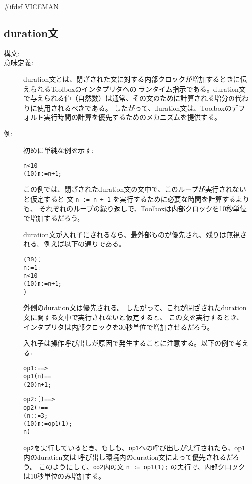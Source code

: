\documentclass[\pformat,12pt]{jarticle}
\begin{document}
#ifdef VICEMAN
\subsection{duration文}
\begin{description}
\item[構文:]

\item[意味定義:]
duration文とは、閉ざされた文に対する内部クロックが増加するときに伝えられるToolboxのインタプリタへの
ランタイム指示である。duration文で与えられる値（自然数）は通常、その文のために計算される増分の代わりに使用されるべきである。
したがって、duration文は、Toolboxのデフォルト実行時間の計算を優先するためのメカニズムを提供する。

\item[例:]初めに単純な例を示す:
\begin{alltt}
       n < 10 
         (10) n := n + 1; 
\end{alltt}
この例では、閉ざされたduration文の文中で、このループが実行されないと仮定すると
文 \texttt{n := n + 1} を実行するために必要な時間を計算するよりも、
それぞれのループの繰り返しで、Toolboxは内部クロックを10秒単位で増加するだろう。

duration文が入れ子にされるなら、最外部ものが優先され、残りは無視される。例えば以下の通りである。

\begin{alltt}
      (30)(
        n := 1;
         n < 10 
           (10) n := n + 1; 
        )
\end{alltt}
外側のduration文は優先される。
したがって、これが閉ざされたduration文に関する文中で実行されないと仮定すると、
この文を実行するとき、インタプリタは内部クロックを30秒単位で増加させるだろう。

入れ子は操作呼び出しが原因で発生することに注意する。以下の例で考える:
\begin{alltt}
      op1 :  ==> 
      op1(m) ==
        (20)  m + 1;

      op2 : () ==> 
      op2() ==
      ( n :  := 3;
       (10)  n := op1(1);
        n) 
\end{alltt}
\texttt{op2}を実行しているとき、もしも、\texttt{op1}への呼び出しが実行されたら、op1内のduration文は
呼び出し環境内のduration文によって優先されるだろう。
このようにして、\texttt{op2}内の文 \texttt{n := op1(1);} の実行で、内部クロックは10秒単位のみ増加する。

\end{description}
\end{document}
